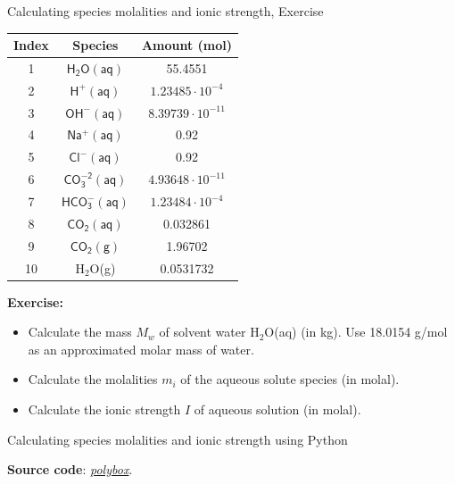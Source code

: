 \begin{frame}{Calculating species molalities and ionic strength,  Exercise}

\lcol
\begin{center}
\begin{tabular}{ccc}
\toprule 
\textbf{Index} & \textbf{Species} & \textbf{Amount (mol)}\tabularnewline
\midrule
1 & \textrm{$\mathsf{H_{2}O(aq)}$} & 55.4551\tabularnewline
2 & \textrm{$\mathsf{H^{+}(aq)}$} & $1.23485\cdot10^{-4}$\tabularnewline
3 & \textrm{$\mathsf{OH^{-}(aq)}$} & $8.39739\cdot10^{-11}$\tabularnewline
4 & \textrm{$\mathsf{Na^{+}(aq)}$} & 0.92\tabularnewline
5 & \textrm{$\mathsf{Cl^{-}(aq)}$} & 0.92\tabularnewline
6 & \textrm{$\mathsf{CO_{3}^{-2}(aq)}$} & $4.93648\cdot10^{-11}$\tabularnewline
7 & \textrm{$\mathsf{HCO_{3}^{-}(aq)}$} & $1.23484\cdot10^{-4}$\tabularnewline
8 & \textrm{$\mathsf{CO_{2}(aq)}$} & 0.032861\tabularnewline
9 & \textrm{$\mathsf{CO_{2}(g)}$} & 1.96702\tabularnewline
10 & H$_{2}$O(g) & 0.0531732\tabularnewline
\bottomrule
\end{tabular}
\par\end{center}

\rcol

\textbf{Exercise:}
\begin{itemize}
\item Calculate the mass $M_{w}$ of solvent water H$_{2}$O(aq) (in kg).
Use 18.0154 g/mol as an approximated molar mass of water.
\item Calculate the molalities $m_{i}$ of the aqueous solute species (in
molal).
\item Calculate the ionic strength $I$ of aqueous solution (in molal).
\end{itemize}

\ecol
\end{frame}
%
%
\begin{frame}{Calculating species molalities and ionic strength using Python}



\textbf{Source code}: \href{https://polybox.ethz.ch/index.php/s/xmvAZqB9bcGvEz3}{\textcolor{indigo(dye)}{\it polybox}}.

\end{frame}
